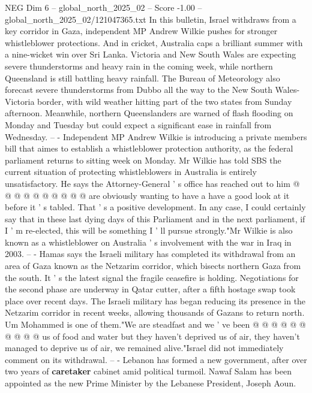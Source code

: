 \begin{textsample}{NEG Dim 6 – global\_north\_2025\_02 – Score -1.00 – global\_north\_2025\_02/121047365.txt}  \label{ex:f6_neg_076}
In this bulletin, Israel withdraws from a key corridor in Gaza, independent MP Andrew Wilkie pushes for stronger whistleblower protections.
And in cricket, Australia caps a brilliant summer with a nine-wicket win over Sri Lanka.
Victoria and New South Wales are expecting severe thunderstorms and heavy rain in the coming week, while northern Queensland is still battling heavy rainfall.
The Bureau of Meteorology also forecast severe thunderstorms from Dubbo all the way to the New South Wales-Victoria border, with wild weather hitting part of the two states from Sunday afternoon.
Meanwhile, northern Queenslanders are warned of flash flooding on Monday and Tuesday but could expect a significant ease in rainfall from Wednesday. -- - Independent MP Andrew Wilkie is introducing a private members bill that aimes to establish a whistleblower protection authority, as the federal parliament returns to sitting week on Monday.
Mr Wilkie has told SBS the current situation of protecting whistleblowers in Australia is entirely unsatisfactory.
He says the Attorney-General ' s office has reached out to him @ @ @ @ @ @ @ @ @ @ are obviously wanting to have a have a good look at it before it ' s tabled.
That ' s a positive development.
In any case, I could certainly say that in these last dying days of this Parliament and in the next parliament, if I ' m re-elected, this will be something I ' ll pursue strongly."Mr Wilkie is also known as a whistleblower on Australia ' s involvement with the war in Iraq in 2003. -- - Hamas says the Israeli military has completed its withdrawal from an area of Gaza known as the Netzarim corridor, which bisects northern Gaza from the south.
It ' s the latest signal the fragile ceasefire is holding.
Negotiations for the second phase are underway in Qatar cutter, after a fifth hostage swap took place over recent days.
The Israeli military has began reducing its presence in the Netzarim corridor in recent weeks, allowing thousands of Gazans to return north.
Um Mohammed is one of them."We are steadfast and we ' ve been @ @ @ @ @ @ @ @ @ @ us of food and water but they haven't deprived us of air, they haven't managed to deprive us of air, we remained alive."Israel did not immediately comment on its withdrawal. -- - Lebanon has formed a new government, after over two years of \textbf{caretaker} cabinet amid political turmoil.
Nawaf Salam has been appointed as the new Prime Minister by the Lebanese President, Joseph Aoun.

\end{textsample}
